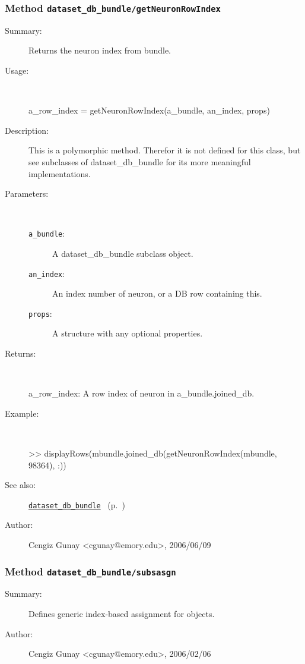 \subsubsection[Method \texttt{getNeuronRowIndex}]{Method \texttt{dataset\_db\_bundle/getNeuronRowIndex}}%
%
\label{ref_dataset_db_bundle__getNeuronRowIndex}%
\hypertarget{ref_dataset_db_bundle__getNeuronRowIndex}{}%
\begin{description}
\item[Summary:]Returns the neuron index from bundle.
%
\item[Usage:]~%
\begin{lyxcode}%
a\_row\_index = getNeuronRowIndex(a\_bundle, an\_index, props)
%
\end{lyxcode}%
%
\item[Description:]%
This is a polymorphic method. Therefor it is not defined for this class, 
 but see subclasses of dataset\_db\_bundle for its more meaningful implementations.
\item[Parameters:]~
\begin{description}%
\item[\texttt{a\_bundle}:]
 A dataset\_db\_bundle subclass object.
\item[\texttt{an\_index}:]
 An index number of neuron, or a DB row containing this.
\item[\texttt{props}:]
 A structure with any optional properties.
\end{description}%
%
\item[Returns:]~

	a\_row\_index: A row index of neuron in a\_bundle.joined\_db.
%
\item[Example:]~
\begin{lyxcode} >> displayRows(mbundle.joined\_db(getNeuronRowIndex(mbundle, 98364), :))\\%
\end{lyxcode}
%
\item[See also:]%
\hyperlink{ref_dataset_db_bundle}{\texttt{dataset\_db\_bundle}}%
\ (p.~\pageref{ref_dataset_db_bundle})%
%
%
\item[Author:]%
Cengiz Gunay <cgunay@emory.edu>, 2006/06/09%
\end{description}
\methodline%
\subsubsection[Method \texttt{subsasgn}]{Method \texttt{dataset\_db\_bundle/subsasgn}}%
%
\label{ref_dataset_db_bundle__subsasgn}%
\hypertarget{ref_dataset_db_bundle__subsasgn}{}%
\begin{description}
\item[Summary:]Defines generic index-based assignment for objects.
%
%
%
%
%
%
%
\item[Author:]%
Cengiz Gunay <cgunay@emory.edu>, 2006/02/06%
\end{description}
\methodline%
